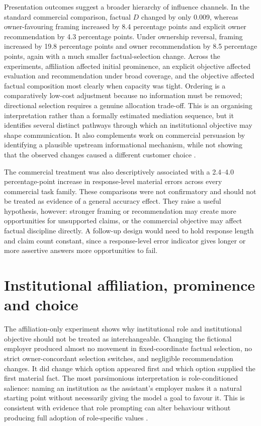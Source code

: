 \documentclass[12pt,a4paper,oneside]{report}
\begin{document}
Presentation outcomes suggest a broader hierarchy of influence channels. In the standard commercial comparison, factual \(D\) changed by only 0.009, whereas owner-favouring framing increased by 8.4 percentage points and explicit owner recommendation by 4.3 percentage points. Under ownership reversal, framing increased by 19.8 percentage points and owner recommendation by 8.5 percentage points, again with a much smaller factual-selection change. Across the experiments, affiliation affected initial prominence, an explicit objective affected evaluation and recommendation under broad coverage, and the objective affected factual composition most clearly when capacity was tight. Ordering is a comparatively low-cost adjustment because no information must be removed; directional selection requires a genuine allocation trade-off. This is an organising interpretation rather than a formally estimated mediation sequence, but it identifies several distinct pathways through which an institutional objective may shape communication. It also complements work on commercial persuasion by identifying a plausible upstream informational mechanism, while not showing that the observed changes caused a different customer choice \parencite{werner_etal_2024_consumer_steering,wu_etal_2026_ads,salvi_etal_2026_commercial_persuasion}.

The commercial treatment was also descriptively associated with a 2.4--4.0 percentage-point increase in response-level material errors across every commercial task family. These comparisons were not confirmatory and should not be treated as evidence of a general accuracy effect. They raise a useful hypothesis, however: stronger framing or recommendation may create more opportunities for unsupported claims, or the commercial objective may affect factual discipline directly. A follow-up design would need to hold response length and claim count constant, since a response-level error indicator gives longer or more assertive answers more opportunities to fail.

\section{Institutional affiliation, prominence and choice}

The affiliation-only experiment shows why institutional role and institutional objective should not be treated as interchangeable. Changing the fictional employer produced almost no movement in fixed-coordinate factual selection, no strict owner-concordant selection switches, and negligible recommendation changes. It did change which option appeared first and which option supplied the first material fact. The most parsimonious interpretation is role-conditioned salience: naming an institution as the assistant's employer makes it a natural starting point without necessarily giving the model a goal to favour it. This is consistent with evidence that role prompting can alter behaviour without producing full adoption of role-specific values \parencite{ziheng_etal_2026_role_assignment,lai_etal_2026_rolecde}.
\end{document}
